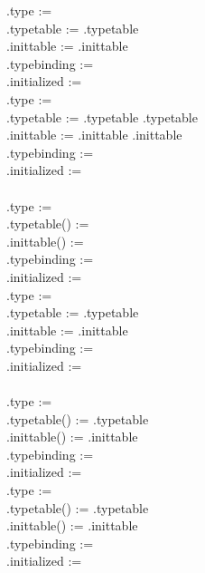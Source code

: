 \documentclass{article}
\begin{document}
\begin{enumerate}
.type := \na\\
.typetable := .typetable\\
.inittable := .inittable\\
.typebinding := \na\\
.initialized := \na\\

.type := \na\\
.typetable := .typetable \union {}.typetable\\
.inittable := .inittable \union {}.inittable\\
.typebinding := \na\\
.initialized := \na\\

{\it {} \rarrow {}}\\
.type := \na\\
.typetable() := \es\\
.inittable() := \es\\
.typebinding := \na\\
.initialized := \na\\

.type := \na\\
.typetable := .typetable\\
.inittable := .inittable\\
.typebinding := \na\\
.initialized := \na\\

{\it {} \rarrow {}}\\
.type := \na\\
.typetable() := .typetable\\
.inittable() := .inittable\\
.typebinding := \na\\
.initialized := \na\\

.type := \na\\
.typetable() := .typetable\\
.inittable() := .inittable\\
.typebinding := \na\\
.initialized := \na\\


\end{enumerate}
\end{document}

